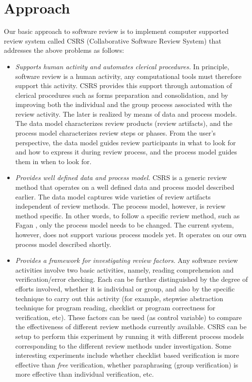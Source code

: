 \section {Approach}
Our basic approach to software review is to implement computer
supported review system  called CSRS (Collaborative Software Review
System) that addresses the above problems as follows:
\begin {itemize}
\item {\sl Supports human activity and automates clerical procedures.}
In principle, software review  is a human activity, any computational
tools must therefore support this activity.  
CSRS provides this support through automation of clerical procedures
such as forms preparation and consolidation, and by improving both the
individual and the group process associated with the review activity.
The later is realized by means of data and process models.
The data model characterizes review products (review artifacts),
and the process model characterizes review steps or phases.
From the user's perspective, the data model guides review participants in
what to look for and how to express it during review process, and
the process model guides them in when to look for.


\item {\sl Provides well defined data and process model.}
CSRS is a generic review method that operates on a well defined data and
process model described earlier. The data model captures  wide
varieties of review artifacts 
independent of review methods. The process model, however, is
review method specific. In other words, to follow a specific review
method, such as Fagan \cite{Fagan76}, only the process model needs to be changed.
The current system, however, does not support various process models
yet. It operates on our own process model described shortly.


\item {\sl Provides a framework for investigating review factors.}
Any software review activities involve two basic activities, namely,
reading comprehension and verification/error checking. Each
can be further distinguished by the degree of efforts involved,
whether it is individual or group, and also by the specific technique
to carry out this activity (for example, stepwise abstraction technique
for program reading, checklist or program correctness for verification,
etc). These factors can be used (as control variable) to compare the
effectiveness of different review methods currently available.
CSRS can be setup to perform this experiment by running it with
different process models corresponding to the different review
methods under investigation. Some interesting experiments include
whether checklist based verification is more effective than {\it free}
verification, whether paraphrasing (group verification) is more effective
than individual verification, etc.


\end{itemize}
